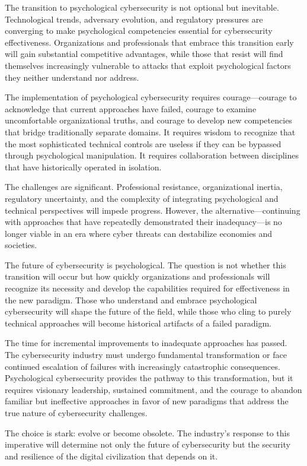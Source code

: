 \documentclass[10pt, twocolumn]{article}
\begin{document}
The transition to psychological cybersecurity is not optional but inevitable. Technological trends, adversary evolution, and regulatory pressures are converging to make psychological competencies essential for cybersecurity effectiveness. Organizations and professionals that embrace this transition early will gain substantial competitive advantages, while those that resist will find themselves increasingly vulnerable to attacks that exploit psychological factors they neither understand nor address.

The implementation of psychological cybersecurity requires courage—courage to acknowledge that current approaches have failed, courage to examine uncomfortable organizational truths, and courage to develop new competencies that bridge traditionally separate domains. It requires wisdom to recognize that the most sophisticated technical controls are useless if they can be bypassed through psychological manipulation. It requires collaboration between disciplines that have historically operated in isolation.

The challenges are significant. Professional resistance, organizational inertia, regulatory uncertainty, and the complexity of integrating psychological and technical perspectives will impede progress. However, the alternative—continuing with approaches that have repeatedly demonstrated their inadequacy—is no longer viable in an era where cyber threats can destabilize economies and societies.

The future of cybersecurity is psychological. The question is not whether this transition will occur but how quickly organizations and professionals will recognize its necessity and develop the capabilities required for effectiveness in the new paradigm. Those who understand and embrace psychological cybersecurity will shape the future of the field, while those who cling to purely technical approaches will become historical artifacts of a failed paradigm.

The time for incremental improvements to inadequate approaches has passed. The cybersecurity industry must undergo fundamental transformation or face continued escalation of failures with increasingly catastrophic consequences. Psychological cybersecurity provides the pathway to this transformation, but it requires visionary leadership, sustained commitment, and the courage to abandon familiar but ineffective approaches in favor of new paradigms that address the true nature of cybersecurity challenges.

The choice is stark: evolve or become obsolete. The industry's response to this imperative will determine not only the future of cybersecurity but the security and resilience of the digital civilization that depends on it.
\end{document}
